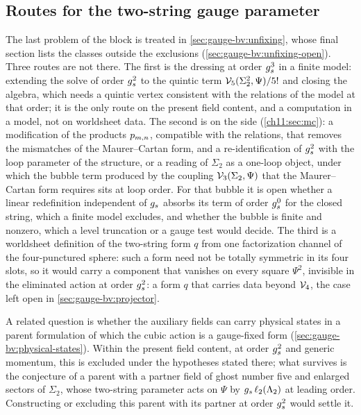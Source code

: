 \subsection{Routes for the two-string gauge parameter}
\label{sec:open:lambda2}

The last problem of the block is treated in \cref{sec:gauge-bv:unfixing}, whose final section lists the classes outside the exclusions (\cref{sec:gauge-bv:unfixing-open}).
Three routes are not there.
The first is the dressing at order $g_s^3$ in a finite model: extending the solve of order $g_s^2$ to the quintic term $\mathcal{V}_{5}(\Sigma_2^2, \Psi) / 5!$ and closing the algebra, which needs a quintic vertex consistent with the \Loo{} relations of the model at that order; it is the only route on the present field content, and a computation in a model, not on worldsheet data.
The second is on the \IBL{} side (\cref{ch11:sec:mc}): a modification of the products $p_{m,n}$, compatible with the \IBL{} relations, that removes the mismatches of the Maurer--Cartan form, and a re-identification of $g_s^2$ with the loop parameter of the \IBL{} structure, or a reading of $\Sigma_2$ as a one-loop object, under which the bubble term produced by the coupling $\mathcal{V}_{3}(\Sigma_2, \Psi)$ that the Maurer--Cartan form requires sits at loop order.
For that bubble it is open whether a linear redefinition independent of $g_s$ absorbs its term of order $g_s^0$ for the closed string, which a finite model excludes, and whether the bubble is finite and nonzero, which a level truncation or a gauge test would decide.
The third is a worldsheet definition of the two-string form $q$ from one factorization channel of the four-punctured sphere: such a form need not be totally symmetric in its four slots, so it would carry a component that vanishes on every square $\Psi^2$, invisible in the eliminated action at order $g_s^2$: a form $q$ that carries data beyond $\mathcal{V}_{4}$, the case left open in \cref{sec:gauge-bv:projector}.

A related question is whether the auxiliary fields can carry physical states in a parent formulation of which the cubic action is a gauge-fixed form (\cref{sec:gauge-bv:physical-states}).
Within the present field content, at order $g_s^2$ and generic momentum, this is excluded under the hypotheses stated there; what survives is the conjecture of a parent with a partner field of ghost number five and enlarged sectors of $\Sigma_2$, whose two-string parameter acts on $\Psi$ by $g_s \, \ell_2(\Lambda_2)$ at leading order.
Constructing or excluding this parent with its partner at order $g_s^2$ would settle it.

